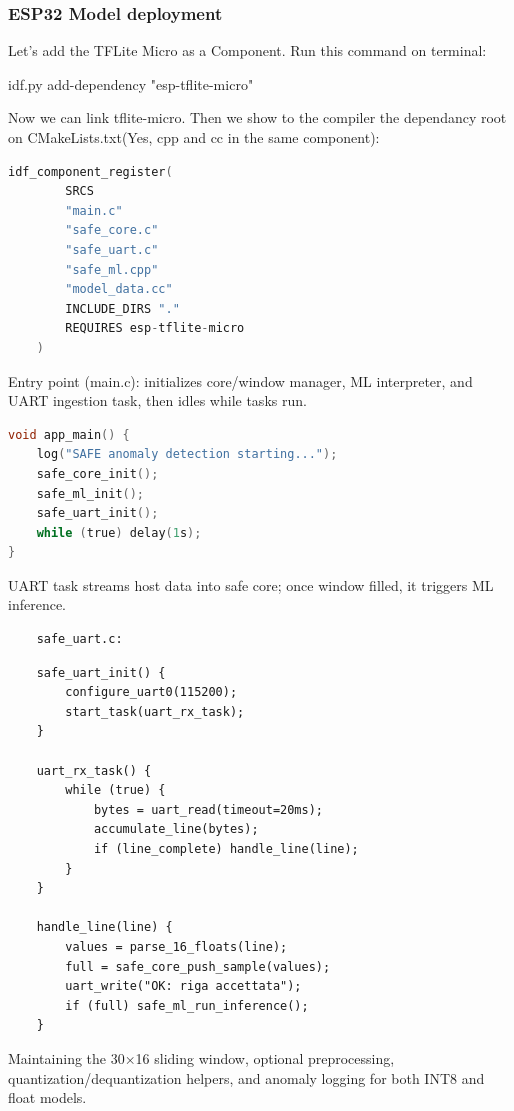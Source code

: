 \subsubsection{ESP32 Model deployment}

Let's add the TFLite Micro as a Component. Run this command on terminal:
\begin{center}
    idf.py add-dependency "esp-tflite-micro"
\end{center}
Now we can link tflite-micro. Then we show to the compiler the dependancy root on CMakeLists.txt(Yes, cpp and cc in the same component):

\begin{lstlisting}[language=C]
    idf_component_register(
        SRCS
        "main.c"
        "safe_core.c"
        "safe_uart.c"
        "safe_ml.cpp"
        "model_data.cc"
        INCLUDE_DIRS "."
        REQUIRES esp-tflite-micro
    )
\end{lstlisting}
Entry point (main.c): initializes core/window manager, ML interpreter, and UART ingestion task, then idles while tasks run.

\begin{lstlisting}[language=C]
void app_main() {
    log("SAFE anomaly detection starting...");
    safe_core_init();
    safe_ml_init();
    safe_uart_init();
    while (true) delay(1s);
}
\end{lstlisting}
UART task streams host data into safe core; once window filled, it triggers ML inference.

\begin{verbatim}
    safe_uart.c:
\end{verbatim}
\begin{lstlisting}
    safe_uart_init() {
        configure_uart0(115200);
        start_task(uart_rx_task);
    }
    
    uart_rx_task() {
        while (true) {
            bytes = uart_read(timeout=20ms);
            accumulate_line(bytes);
            if (line_complete) handle_line(line);
        }
    }
    
    handle_line(line) {
        values = parse_16_floats(line);
        full = safe_core_push_sample(values);
        uart_write("OK: riga accettata");
        if (full) safe_ml_run_inference();
    }
\end{lstlisting}
Maintaining the 30×16 sliding window, optional preprocessing, quantization/dequantization helpers, and anomaly logging for both INT8 and float models.

